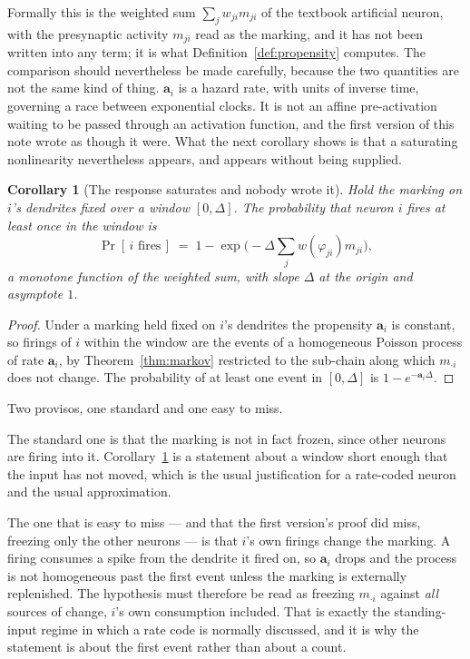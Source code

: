 \documentclass[11pt,a4paper]{article}
\theoremstyle{plain}
\newtheorem{corollary}[theorem]{Corollary}
\theoremstyle{definition}
\theoremstyle{remark}
\newcommand{\prop}{\mathbf{a}}
\newcommand{\wmap}{w}
\begin{document}
Formally this is the weighted sum $\sum_j w_{ji} m_{ji}$ of the textbook artificial neuron, with the
presynaptic activity $m_{ji}$ read as the marking, and it has not been written into any term; it is
what Definition~\ref{def:propensity} computes. The comparison should nevertheless be made carefully,
because the two quantities are not the same kind of thing. $\prop_i$ is a hazard rate, with units of
inverse time, governing a race between exponential clocks. It is not an affine pre-activation waiting
to be passed through an activation function, and the first version of this note wrote as though it
were. What the next corollary shows is that a saturating nonlinearity nevertheless appears, and
appears without being supplied.

\begin{corollary}[The response saturates and nobody wrote it]
\label{cor:sigmoid}
Hold the marking on $i$'s dendrites fixed over a window $[0,\Delta]$. The probability that neuron $i$
fires at least once in the window is
\[
\Pr[\,\text{$i$ fires}\,] \;=\; 1 - \exp\!\big(-\Delta \textstyle\sum_j \wmap(\varphi_{ji}) m_{ji}\big),
\]
a monotone function of the weighted sum, with slope $\Delta$ at the origin and asymptote $1$.
\end{corollary}

\begin{proof}
Under a marking held fixed on $i$'s dendrites the propensity $\prop_i$ is constant, so firings of $i$
within the window are the events of a homogeneous Poisson process of rate $\prop_i$, by
Theorem~\ref{thm:markov} restricted to the sub-chain along which $m_{\cdot i}$ does not change. The
probability of at least one event in $[0,\Delta]$ is $1 - e^{-\prop_i \Delta}$.
\end{proof}

Two provisos, one standard and one easy to miss.

The standard one is that the marking is not in fact frozen, since other neurons are firing into it.
Corollary~\ref{cor:sigmoid} is a statement about a window short enough that the input has not moved,
which is the usual justification for a rate-coded neuron and the usual approximation.

The one that is easy to miss --- and that the first version's proof did miss, freezing only the other
neurons --- is that $i$'s own firings change the marking. A firing consumes a spike from the dendrite
it fired on, so $\prop_i$ drops and the process is not homogeneous past the first event unless the
marking is externally replenished. The hypothesis must therefore be read as freezing $m_{\cdot i}$
against \emph{all} sources of change, $i$'s own consumption included. That is exactly the
standing-input regime in which a rate code is normally discussed, and it is why the statement is
about the first event rather than about a count.
\end{document}
